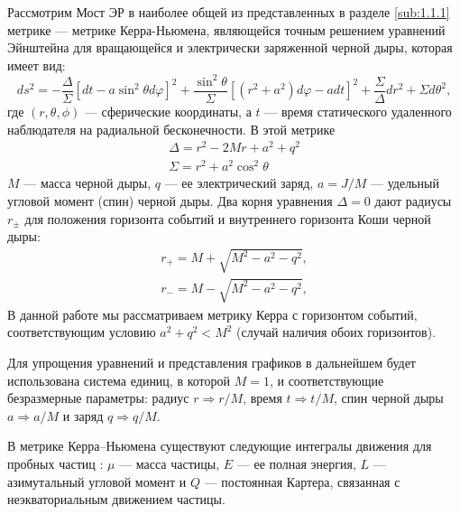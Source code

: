 Рассмотрим Мост ЭР в наиболее общей из представленных в разделе \cref{sub:1.1.1} метрике — метрике Керра-Ньюмена, являющейся точным решением уравнений Эйнштейна для вращающейся и электрически заряженной черной дыры, которая имеет вид:
\begin{equation}
	\label{eq:KN}
	ds^2=-\frac{\Delta}{\Sigma}[dt-a\sin^2\theta d\varphi]^2+\frac{\sin^2\theta}{\Sigma}[(r^2+a^2)d\varphi -adt]^2  +\frac{\Sigma}{\Delta}dr^2+\Sigma d\theta^2\!,
\end{equation}
где \((r,\theta,\phi)\) — сферические координаты, а \(t\) — время статического удаленного наблюдателя на радиальной бесконечности. В этой метрике
\begin{subequations}
    \label{eq:DS}
    \begin{gather}
        \Delta = r^2-2Mr+a^2+q^2 \label{eq:Delta} \\
        \Sigma= r^2+a^2\cos^2\theta \label{eq:Sigma}
    \end{gather}
\end{subequations}
\(M\) — масса черной дыры, \(q\) — ее электрический заряд, \(a= J/M\) — удельный угловой момент (спин) черной дыры. Два корня уравнения \(\Delta=0\) дают радиусы \(r_±\) для положения горизонта событий и внутреннего горизонта Коши черной дыры:
\begin{subequations}
    \label{eq:rads}
    \begin{gather}
        r_+=M+\sqrt{M^2-a^2-q^2}, \label{r+} \\
        r_-=M-\sqrt{M^2-a^2-q^2}, \label{r-}
    \end{gather}
\end{subequations}
В данной работе мы рассматриваем метрику Керра с горизонтом событий, соответствующим условию \(a^2+q^2<M^2\) (случай наличия обоих горизонтов).

Для упрощения уравнений и представления графиков в дальнейшем будет использована система единиц, в которой \(M=1\), и соответствующие безразмерные параметры: радиус \(r\Rightarrow r/M\), время \(t\Rightarrow t/M\), спин черной дыры \(a\Rightarrow a/M\) и заряд \(q\Rightarrow q/M\).

В метрике Керра–Ньюмена существуют следующие интегралы движения для пробных частиц \cite{carterGlobalStructureKerr1968}: \(\mu\) — масса частицы, \(E\) — ее полная энергия, \(L\) — азимутальный угловой момент и \(Q\) — постоянная Картера, связанная с неэкваториальным движением частицы.

